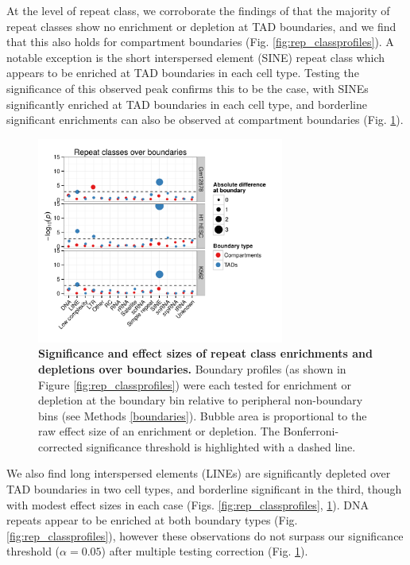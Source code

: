 \documentclass[a4paper,11pt,oneside]{book}
\begin{document}
At the level of repeat class, we corroborate the findings of \citet{Dixon2012} that the majority of repeat classes show no enrichment or depletion at TAD boundaries, and we find that this also holds for compartment boundaries (Fig. \ref{fig:rep_classprofiles}). A notable exception is the short interspersed element (SINE) repeat class which appears to be enriched at TAD boundaries in each cell type. Testing the significance of this observed peak confirms this to be the case, with SINEs significantly enriched at TAD boundaries in each cell type, and borderline significant enrichments can also be observed at compartment boundaries (Fig. \ref{fig:rep_classbubble}).

\begin{figure}
\begin{center} 
\includegraphics[width=3.2in]{figs/rep_classbubble.pdf}
\captionsetup{width=\textwidth}
\caption[Significance and effect sizes of repeat class enrichments and depletions over boundaries.]{ {\bf Significance and effect sizes of repeat class enrichments and depletions over boundaries.}
Boundary profiles (as shown in Figure \ref{fig:rep_classprofiles}) were each tested for enrichment or depletion at the boundary bin relative to peripheral non-boundary bins (see Methods \ref{boundaries}). Bubble area is proportional to the raw effect size of an enrichment or depletion. The Bonferroni-corrected significance threshold is highlighted with a dashed line.
}\label{fig:rep_classbubble}
\end{center}
\end{figure} 

We also find long interspersed elements (LINEs) are significantly depleted over TAD boundaries in two cell types, and borderline significant in the third, though with modest effect sizes in each case (Figs. \ref{fig:rep_classprofiles}, \ref{fig:rep_classbubble}). DNA repeats appear to be enriched at both boundary types (Fig. \ref{fig:rep_classprofiles}), however these observations do not surpass our significance threshold ($\alpha = 0.05$) after multiple testing correction (Fig. \ref{fig:rep_classbubble}).
\end{document}
